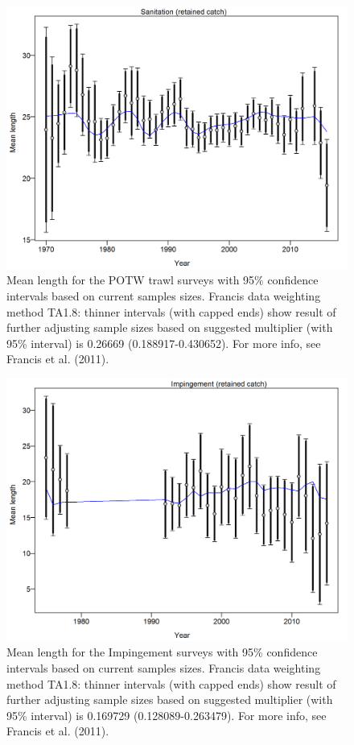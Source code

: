 \documentclass[12pt,]{article}
\begin{document}
\begin{figure}[htbp]
\centering
\includegraphics{r4ss/plots_mod1/comp_lenfit_data_weighting_TA1.8_Sanitation.png}
\caption{Mean length for the POTW trawl surveys with 95\% confidence
intervals based on current samples sizes. Francis data weighting method
TA1.8: thinner intervals (with capped ends) show result of further
adjusting sample sizes based on suggested multiplier (with 95\%
interval) is 0.26669 (0.188917-0.430652). For more info, see Francis et
al. (2011). \label{fig:comp_lenfit_data_weighting_TA1.8_Sanitation}}
\end{figure}

\begin{figure}[htbp]
\centering
\includegraphics{r4ss/plots_mod1/comp_lenfit_data_weighting_TA1.8_Impingement.png}
\caption{Mean length for the Impingement surveys with 95\% confidence
intervals based on current samples sizes. Francis data weighting method
TA1.8: thinner intervals (with capped ends) show result of further
adjusting sample sizes based on suggested multiplier (with 95\%
interval) is 0.169729 (0.128089-0.263479). For more info, see Francis et
al. (2011). \label{fig:comp_lenfit_data_weighting_TA1.8_Impingement}}
\end{figure}
\end{document}
